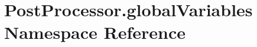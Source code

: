 \hypertarget{namespacePostProcessor_1_1globalVariables}{}\section{Post\+Processor.\+global\+Variables Namespace Reference}
\label{namespacePostProcessor_1_1globalVariables}
